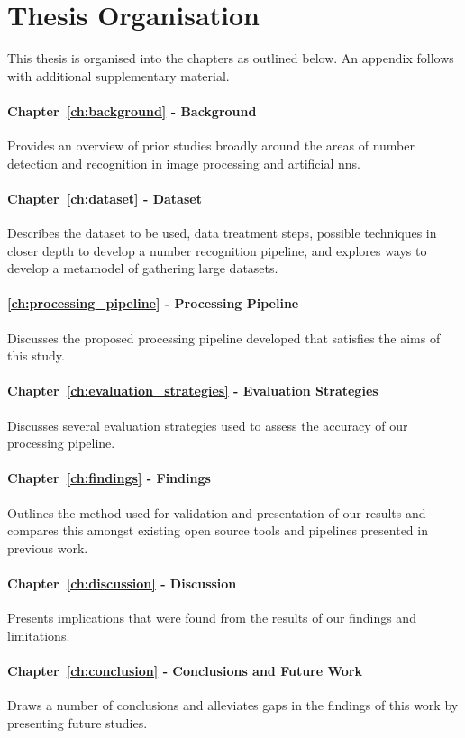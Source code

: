 \section{Thesis Organisation}
\label{sec:introduction:organisation}

This thesis is organised into the chapters as outlined below. An appendix follows with additional supplementary material.

\paragraph{Chapter~\ref{ch:background} - Background} Provides an overview of prior studies broadly around the areas of number detection and recognition in image processing and artificial \glspl{nn}.

\paragraph{Chapter~\ref{ch:dataset} - Dataset} Describes the dataset to be used, data treatment steps, possible techniques in closer depth to develop a number recognition pipeline, and explores ways to develop a metamodel of gathering large datasets.

\paragraph{\autoref{ch:processing_pipeline} - Processing Pipeline} Discusses the proposed processing pipeline developed that satisfies the aims of this study.

\paragraph{Chapter~\ref{ch:evaluation_strategies} - Evaluation Strategies} Discusses several evaluation strategies used to assess the accuracy of our processing pipeline.

\paragraph{Chapter~\ref{ch:findings} - Findings} Outlines the method used for validation and presentation of our results and compares this amongst existing open source tools and pipelines presented in previous work.

\paragraph{Chapter~\ref{ch:discussion} - Discussion} Presents implications that were found from the results of our findings and limitations.

\paragraph{Chapter~\ref{ch:conclusion} - Conclusions and Future Work} Draws a number of conclusions and alleviates gaps in the findings of this work by presenting future studies.
